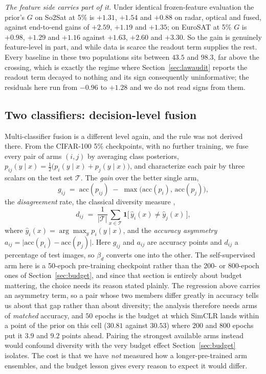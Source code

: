 \emph{The feature side carries part of it.} Under identical frozen-feature
evaluation the prior's $G$ on So2Sat at 5\% is $+1.31$, $+1.54$ and $+0.88$
on radar, optical and fused, against end-to-end gains of $+2.59$, $+1.19$
and $+1.35$; on EuroSAT at 5\% $G$ is $+0.98$, $+1.29$ and $+1.16$ against
$+1.63$, $+2.60$ and $+3.30$. So the gain is genuinely feature-level in
part, and while data is scarce the readout term supplies the rest. Every
baseline in these two populations sits between $43.5$ and $98.3$, far above
the crossing, which is exactly the regime where Section~\ref{sec:lawaudit}
reports the readout term decayed to nothing and its sign consequently
uninformative; the residuals here run from $-0.96$ to $+1.28$ and we do not
read signs from them.

\subsection{Two classifiers: decision-level fusion}\label{sec:decisionfusion}
Multi-classifier fusion is a different level again, and the rule was not
derived there. From the CIFAR-100 5\% checkpoints, with no further training, we
fuse every pair of arms $(i,j)$ by averaging class posteriors,
$p_{ij}(y \mid x) = \tfrac{1}{2}\bigl(p_i(y \mid x) + p_j(y \mid x)\bigr)$, and
characterize each pair by three scalars on the test set $\mathcal{T}$. The
\emph{gain} over the better single arm,
\begin{equation}
  g_{ij} \;=\; \mathrm{acc}(p_{ij}) \;-\; \max\bigl(\mathrm{acc}(p_i),\,
  \mathrm{acc}(p_j)\bigr),
  \label{eq:ensgaindef}
\end{equation}
the \emph{disagreement} rate, the classical diversity measure
\citep{brown2005diversity},
\begin{equation}
  d_{ij} \;=\; \frac{1}{|\mathcal{T}|} \sum_{x \in \mathcal{T}}
  \mathbf{1}\bigl[\, \hat{y}_i(x) \neq \hat{y}_j(x) \,\bigr],
  \label{eq:disagree}
\end{equation}
where $\hat{y}_i(x) = \arg\max_y p_i(y \mid x)$, and the \emph{accuracy
asymmetry} $a_{ij} = \lvert \mathrm{acc}(p_i) -
\mathrm{acc}(p_j) \rvert$. Here $g_{ij}$ and $a_{ij}$ are accuracy points and $d_{ij}$ a percentage of
test images, so $\beta_d$ converts one into the other. The self-supervised arm here is a
50-epoch pre-training checkpoint rather than the 200- or 800-epoch ones of
Section~\ref{sec:budget}, and since that section is entirely about budget
mattering, the choice needs its reason stated plainly. The regression above
carries an asymmetry term, so a pair whose two members differ greatly in
accuracy tells us about that gap rather than about diversity; the analysis
therefore needs arms of \emph{matched} accuracy, and $50$ epochs is the
budget at which SimCLR lands within a point of the prior on this cell
($30.81$ against $30.53$) where $200$ and $800$ epochs put it $3.9$ and
$9.2$ points ahead. Pairing the strongest available arms instead would confound diversity with
the very budget effect Section~\ref{sec:budget} isolates. The cost is that we have
\emph{not} measured how a longer-pre-trained arm ensembles, and the budget
lesson gives every reason to expect it would differ.

